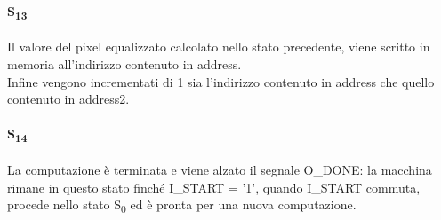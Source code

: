 \paragraph{S\textsubscript{13}}
Il valore del pixel equalizzato calcolato nello stato precedente, viene scritto in memoria all'indirizzo contenuto in address.\\
Infine vengono incrementati di 1 sia l'indirizzo contenuto in address che quello contenuto in address2.
\paragraph{S\textsubscript{14}}
La computazione è terminata e viene alzato il segnale O\_DONE: la macchina rimane in questo stato finché I\_START = '1', quando I\_START commuta, procede nello stato S\textsubscript{0} ed è pronta per una nuova computazione.
